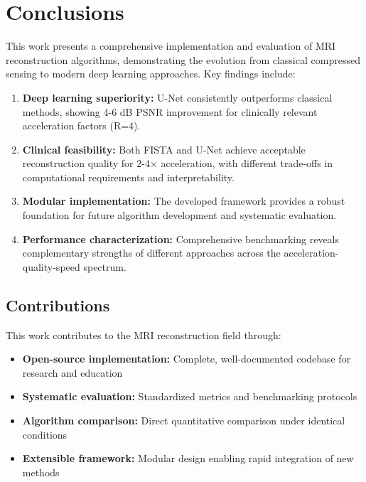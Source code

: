 \documentclass[11pt,a4paper]{article}
\begin{document}
\section{Conclusions}

This work presents a comprehensive implementation and evaluation of MRI reconstruction algorithms, demonstrating the evolution from classical compressed sensing to modern deep learning approaches. Key findings include:

\begin{enumerate}
    \item \textbf{Deep learning superiority:} U-Net consistently outperforms classical methods, showing 4-6 dB PSNR improvement for clinically relevant acceleration factors (R=4).

    \item \textbf{Clinical feasibility:} Both FISTA and U-Net achieve acceptable reconstruction quality for 2-4× acceleration, with different trade-offs in computational requirements and interpretability.

    \item \textbf{Modular implementation:} The developed framework provides a robust foundation for future algorithm development and systematic evaluation.

    \item \textbf{Performance characterization:} Comprehensive benchmarking reveals complementary strengths of different approaches across the acceleration-quality-speed spectrum.
\end{enumerate}

\subsection{Contributions}

This work contributes to the MRI reconstruction field through:

\begin{itemize}
    \item \textbf{Open-source implementation:} Complete, well-documented codebase for research and education
    \item \textbf{Systematic evaluation:} Standardized metrics and benchmarking protocols
    \item \textbf{Algorithm comparison:} Direct quantitative comparison under identical conditions
    \item \textbf{Extensible framework:} Modular design enabling rapid integration of new methods
\end{itemize}
\end{document}
